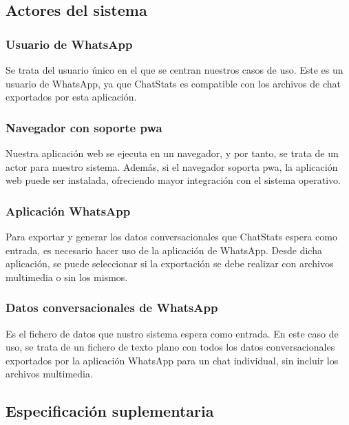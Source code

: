 \subsection{Actores del sistema}
\label{subsec:system-actors}

\subsubsection{Usuario de WhatsApp}

Se trata del usuario único en el que se centran nuestros casos de uso. Este es un usuario de WhatsApp, ya que ChatStats es compatible con los archivos de chat exportados por esta aplicación.

\subsubsection{Navegador con soporte \acrfull{pwa}}

Nuestra aplicación web se ejecuta en un navegador, y por tanto, se trata de un actor para nuestro sistema. Además, si el navegador soporta \acrfull{pwa}, la aplicación web puede ser instalada, ofreciendo mayor integración con el sistema operativo.

\subsubsection{Aplicación WhatsApp}

Para exportar y generar los datos conversacionales que ChatStats espera como entrada, es necesario hacer uso de la aplicación de WhatsApp. Desde dicha aplicación, se puede seleccionar si la exportación se debe realizar con archivos multimedia o sin los mismos.

\subsubsection{Datos conversacionales de WhatsApp}

Es el fichero de datos que nustro sistema espera como entrada. En este caso de uso, se trata de un fichero de texto plano con todos los datos conversacionales exportados por la aplicación WhatsApp para un chat individual, sin incluir los archivos multimedia.

\subsection{Especificación suplementaria}
\label{subsect:suplementary-specification}

